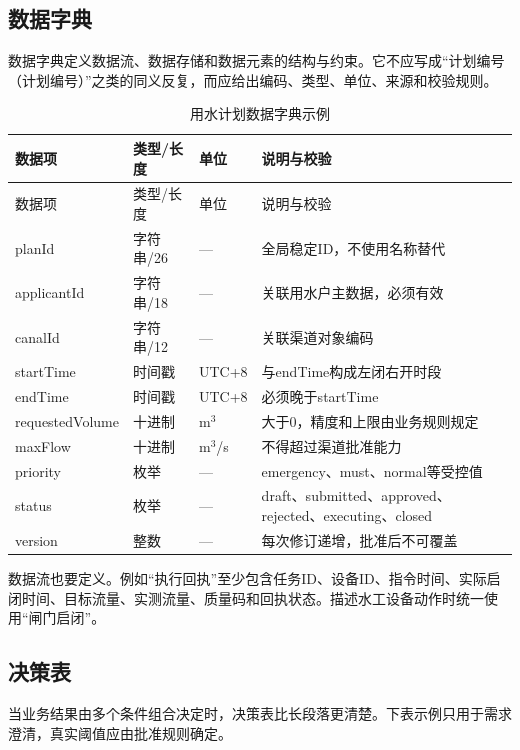 \subsection{数据字典}

数据字典定义数据流、数据存储和数据元素的结构与约束。它不应写成“计划编号（计划编号）”之类的同义反复，而应给出编码、类型、单位、来源和校验规则。

\begin{longtable}{p{2.9cm}p{2.0cm}p{1.7cm}p{4.8cm}}
\caption{用水计划数据字典示例}\label{tab:water-plan-dictionary}\\
\toprule
数据项 & 类型/长度 & 单位 & 说明与校验 \\
\midrule
\endfirsthead
\toprule
数据项 & 类型/长度 & 单位 & 说明与校验 \\
\midrule
\endhead
planId & 字符串/26 & — & 全局稳定ID，不使用名称替代 \\
applicantId & 字符串/18 & — & 关联用水户主数据，必须有效 \\
canalId & 字符串/12 & — & 关联渠道对象编码 \\
startTime & 时间戳 & UTC+8 & 与endTime构成左闭右开时段 \\
endTime & 时间戳 & UTC+8 & 必须晚于startTime \\
{\small requestedVolume} & 十进制 & m$^3$ & 大于0，精度和上限由业务规则规定 \\
maxFlow & 十进制 & m$^3$/s & 不得超过渠道批准能力 \\
priority & 枚举 & — & emergency、must、normal等受控值 \\
status & 枚举 & — & draft、submitted、approved、rejected、executing、closed \\
version & 整数 & — & 每次修订递增，批准后不可覆盖 \\
\bottomrule
\end{longtable}

数据流也要定义。例如“执行回执”至少包含任务ID、设备ID、指令时间、实际启闭时间、目标流量、实测流量、质量码和回执状态。描述水工设备动作时统一使用“闸门启闭”。

\subsection{决策表}

当业务结果由多个条件组合决定时，决策表比长段落更清楚。下表示例只用于需求澄清，真实阈值应由批准规则确定。

